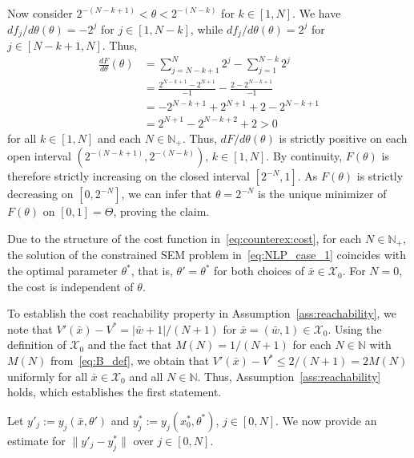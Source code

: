 \documentclass[a4paper,fleqn]{cas-dc}
\begin{document}
\begin{pf}
\begin{pf}
		Now consider $2^{-(N-k+1)}<\theta<2^{-(N-k)}$ for $k\in[1,N]$. We have $df_j/d\theta(\theta)=-2^j$ for $j\in[1,N-k]$, while $df_j/d\theta(\theta)=2^j$ for $j\in[N-k+1,N]$.
		Thus,
		\begin{align*}
			\frac{dF}{d\theta}(\theta)
			&= \sum_{j=N-k+1}^N2^j - \sum_{j=1}^{N-k}2^j \\
			&= \frac{2^{N-k+1}-2^{N+1}}{-1} - \frac{2-2^{N-k+1}}{-1}\\
			&= -2^{N-k+1}+2^{N+1} + 2-2^{N-k+1}\\
			&= 2^{N+1} -2^{N-k+2} + 2 > 0
		\end{align*}
		for all $k\in[1,N]$ and each $N\in\mathbb{N}_{+}$.
		Thus, $dF/d\theta(\theta)$ is strictly positive on each open interval $(2^{-(N-k+1)},2^{-(N-k)})$, $k\in[1,N]$. By continuity, $F(\theta)$ is therefore strictly increasing on the closed interval $[2^{-N},1]$.
		As $F(\theta)$ is strictly decreasing on $[0,2^{-N}]$, we can infer that $\theta=2^{-N}$ is the unique minimizer of $F(\theta)$ on $[0,1]=\Theta$, proving the claim.
	\end{pf}
	
	Due to the structure of the cost function in~\eqref{eq:counterex:cost}, for each $N\in\mathbb{N}_+$, the solution of the constrained SEM problem in~\eqref{eq:NLP_case_1} coincides with the optimal parameter $\theta^*$, that is, $\theta'=\theta^*$ for both choices of $\bar{x}\in\mathcal{X}_0$. For $N=0$, the cost is independent of $\theta$.
	
	To establish the cost reachability property in Assumption~\ref{ass:reachability}, we note that $V'(\bar{x}) - V^* = |\bar{w}+1|/(N+1)$ for $\bar{x} = (\bar{w},1) \in\mathcal{X}_0$. Using the definition of $\mathcal{X}_0$ and the fact that $M(N) = 1/(N+1)$ for each $N\in\mathbb{N}$ with $M(N)$ from~\eqref{eq:B_def}, we obtain that $V'(\bar{x}) - V^* \leq 2/(N+1) = 2M(N)$ uniformly for all $\bar{x}\in\mathcal{X}_0$ and all $N\in\mathbb{N}$.
	Thus, Assumption~\ref{ass:reachability} holds, which establishes the first statement.
	
	Let $y'_j := y_j(\bar{x},\theta')$ and $y^*_j := y_j({x}_0^*,\theta^*)$, $j\in[0,N]$.
	We now provide an estimate for $\|y'_j-y^*_j\|$ over $j\in[0,N]$.
	

\end{pf}
\end{document}
